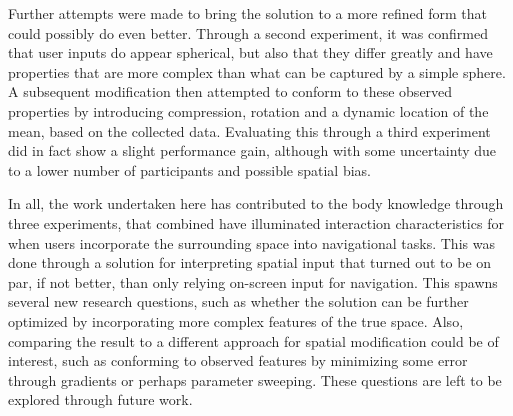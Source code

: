 
Further attempts were made to bring the solution to a more refined form that could possibly do even better. Through a second experiment, it was confirmed that user inputs do appear spherical, but also that they differ greatly and have  properties that are more complex than what can be captured by a simple sphere. A subsequent modification then attempted to conform to these observed properties by introducing compression, rotation and a dynamic location of the mean, based on the collected data.  Evaluating this through a third experiment did in fact show a slight performance gain, although with some uncertainty due to a lower number of participants and possible spatial bias. 


In all, the work undertaken here has contributed to the body knowledge through three experiments, that combined have illuminated interaction characteristics for when users incorporate the surrounding space into navigational tasks. This was done through a solution for interpreting spatial input that turned out to be on par, if not better, than only relying  on-screen input  for navigation. This spawns several new research questions, such as whether the solution can be further optimized by incorporating more complex features of the true space.  Also, comparing the result to a  different approach for spatial modification could be of interest, such as conforming to observed features by  minimizing some error  through gradients or perhaps parameter sweeping. These questions are  left to be explored through future work.

%


